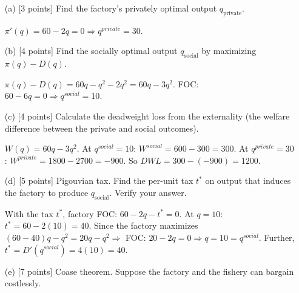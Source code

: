 \documentclass[11pt]{article}
\begin{document}
\begin{enumerate}[label=(\alph*)]

\item[ (a) ] [3 points] Find the factory's privately optimal output $q_{\text{private}}$.
\item[] $\pi'(q)=60-2q=0\Rightarrow q^{private}=30$.

\item[ (b) ] [4 points] Find the socially optimal output $q_{\text{social}}$ by maximizing $\pi(q) - D(q)$.
\item[] $\pi(q)-D(q)=60q-q^2-2q^2=60q-3q^2$. FOC: $60-6q=0\Rightarrow q^{social}=10$.

\item[ (c) ] [4 points] Calculate the deadweight loss from the externality (the welfare difference between the private and social outcomes).
\item[] $W(q)=60q-3q^2$. At $q^{social}=10$: $W^{social}=600-300=300$. At $q^{private}=30$: $W^{private}=1800-2700=-900$. So $DWL=300-(-900)=1200$.

\item[ (d) ] [5 points] Pigouvian tax. Find the per-unit tax $t^*$ on output that induces the factory to produce $q_{\text{social}}$. Verify your answer.
\item[] With the tax $t^*$, factory FOC: $60-2q-t^*=0$. At $q=10$: $t^*=60-2(10)=40$. Since the factory maximizes $(60-40)q-q^2=20q-q^2\Rightarrow$ FOC: $20-2q=0\Rightarrow q=10=q^{social}$. Further, $t^*=D'(q^{social})=4(10)=40$.

\item[ (e) ] [7 points] Coase theorem. Suppose the factory and the fishery can bargain costlessly.


\end{enumerate}
\end{document}
